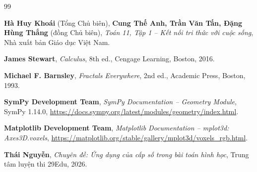 \documentclass[12pt,a4paper,oneside]{book}
\theoremstyle{theorem}
\theoremstyle{definition}
\begin{document}
\begin{thebibliography}{99}

\textbf{Hà Huy Khoái} (Tổng Chủ biên), \textbf{Cung Thế Anh, Trần Văn Tấn, Đặng Hùng Thắng} (đồng Chủ biên),
\textit{Toán 11, Tập 1 -- Kết nối tri thức với cuộc sống},
Nhà xuất bản Giáo dục Việt Nam.

\textbf{James Stewart},
\textit{Calculus},
8th ed.,
Cengage Learning, Boston, 2016.

\textbf{Michael F. Barnsley},
\textit{Fractals Everywhere},
2nd ed.,
Academic Press, Boston, 1993.

\textbf{SymPy Development Team},
\textit{SymPy Documentation -- Geometry Module},
SymPy 1.14.0,
\url{https://docs.sympy.org/latest/modules/geometry/index.html}.

\textbf{Matplotlib Development Team},
\textit{Matplotlib Documentation -- mplot3d: Axes3D.voxels},
\url{https://matplotlib.org/stable/gallery/mplot3d/voxels_rgb.html}.

\textbf{Thái Nguyễn},
\textit{Chuyên đề: Ứng dụng của cấp số trong bài toán hình học},
Trung tâm luyện thi 29Edu, 2026.

\end{thebibliography}
\end{document}
